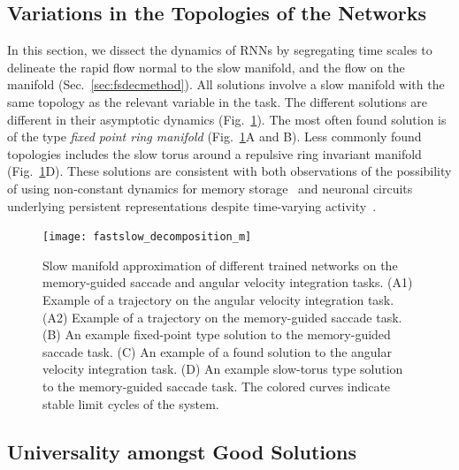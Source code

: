 \documentclass{article} %
\newcounter{ct}
\theoremstyle{definition}
\theoremstyle{remark}
\begin{document}
\subsection{Variations in the Topologies of the Networks}\label{sec:topologies}
In this section, we dissect the dynamics of RNNs by segregating time scales to delineate the rapid flow normal to the slow manifold, and the flow on the manifold (Sec.~\ref{sec:fsdecmethod}).
%
All solutions involve a slow manifold with the same topology as the relevant variable in the task.
The different solutions are different in their asymptotic dynamics (Fig.~\ref{fig:fastslow_decomposition}).
The most often found solution is of the type \emph{fixed point ring manifold} (Fig.~\ref{fig:fastslow_decomposition}A and B).
%
Less commonly found topologies includes %
the slow torus around a repulsive ring invariant manifold (Fig.~\ref{fig:fastslow_decomposition}D).
These solutions are consistent with both observations of the possibility of using non-constant dynamics for memory storage~\citep{hirsch1995computing, Park2023a} and neuronal circuits underlying persistent representations despite time-varying activity~\citep{druckmann2012neuronal}.

\begin{figure}[tbhp]
  \centering
  \texttt{[image: fastslow\_decomposition\_m]}
  \caption{Slow manifold approximation of different trained networks on the memory-guided saccade and angular velocity integration tasks.
 (A1) Example of a trajectory on the angular velocity integration task.
 (A2) Example of a trajectory on the memory-guided saccade task.
 (B) An example fixed-point type solution to the memory-guided saccade task.
 (C) An example of a found solution to the angular velocity integration task.
 (D) An example slow-torus type solution to the memory-guided saccade task. The colored curves indicate stable limit cycles of the system.
}\label{fig:fastslow_decomposition}
\end{figure}



\subsection{Universality amongst Good Solutions}
\end{document}
